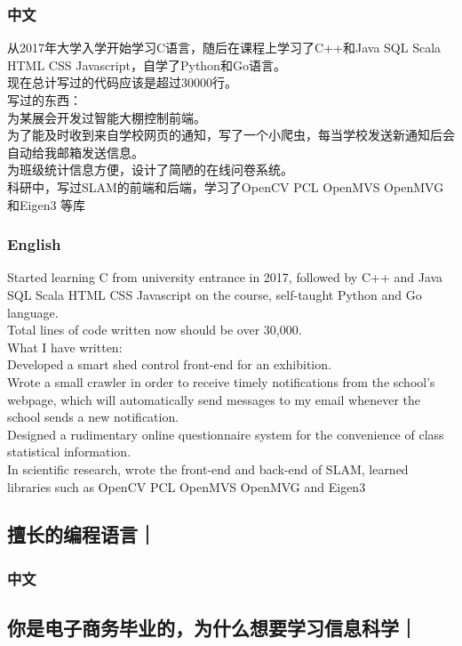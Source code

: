 \documentclass[lang=cn,11pt,a4paper]{elegantpaper}
\begin{document}
\subsubsection{中文}

从2017年大学入学开始学习C语言，随后在课程上学习了C++和Java SQL Scala HTML CSS Javascript，自学了Python和Go语言。\\
现在总计写过的代码应该是超过30000行。\\
写过的东西：\\
为某展会开发过智能大棚控制前端。\\
为了能及时收到来自学校网页的通知，写了一个小爬虫，每当学校发送新通知后会自动给我邮箱发送信息。\\
为班级统计信息方便，设计了简陋的在线问卷系统。\\
科研中，写过SLAM的前端和后端，学习了OpenCV PCL OpenMVS OpenMVG和Eigen3 等库\\
\subsubsection{English}
Started learning C from university entrance in 2017, followed by C++ and Java SQL Scala HTML CSS Javascript on the course, self-taught Python and Go language. \\
Total lines of code written now should be over 30,000. \\
What I have written: \\
Developed a smart shed control front-end for an exhibition. \\
Wrote a small crawler in order to receive timely notifications from the school's webpage, which will automatically send messages to my email whenever the school sends a new notification. \\
Designed a rudimentary online questionnaire system for the convenience of class statistical information. \\
In scientific research, wrote the front-end and back-end of SLAM, learned libraries such as OpenCV PCL OpenMVS OpenMVG and Eigen3 \\

\subsection{擅长的编程语言｜}
\subsubsection{中文}
\subsection{你是电子商务毕业的，为什么想要学习信息科学｜}
\end{document}
